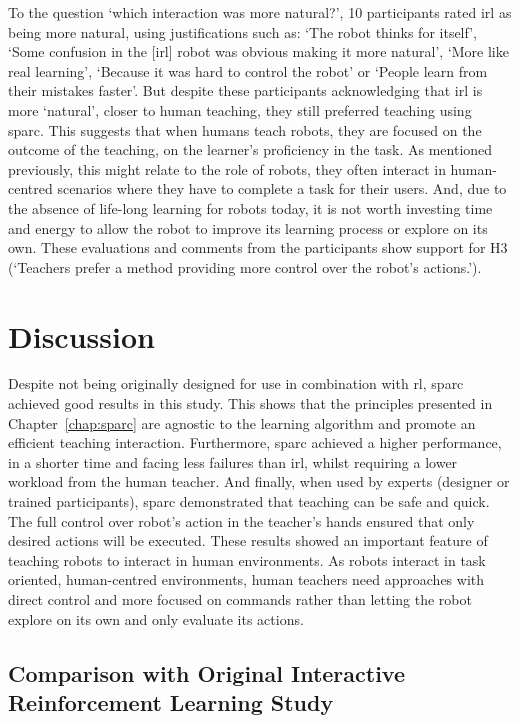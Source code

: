 To the question `which interaction was more natural?', 10 participants rated \gls{irl} as being more natural, using justifications such as: `The robot thinks for itself', `Some confusion in the [\gls{irl}] robot was obvious making it more natural', `More like real learning', `Because it was hard to control the robot' or `People learn from their mistakes faster'. But despite these participants acknowledging that \gls{irl} is more `natural', closer to human teaching, they still preferred teaching using \gls{sparc}. This suggests that when humans teach robots, they are focused on the outcome of the teaching, on the learner's proficiency in the task. As mentioned previously, this might relate to the role of robots, they often interact in human-centred scenarios where they have to complete a task for their users. And, due to the absence of life-long learning for robots today, it is not worth investing time and energy to allow the robot to improve its learning process or explore on its own. These evaluations and comments from the participants show support for H3 (`Teachers prefer a method providing more control over the robot's actions.').

\section{Discussion}
\label{sec:control_discussion}

Despite not being originally designed for use in combination with \acrlong{rl}, \gls{sparc} achieved good results in this study. This shows that the principles presented in Chapter~\ref{chap:sparc} are agnostic to the learning algorithm and promote an efficient teaching interaction. Furthermore, \gls{sparc} achieved a higher performance, in a shorter time and facing less failures than \gls{irl}, whilst requiring a lower workload from the human teacher. And finally, when used by experts (designer or trained participants), \gls{sparc} demonstrated that teaching can be safe and quick. The full control over robot's action in the teacher's hands ensured that only desired actions will be executed. These results showed an important feature of teaching robots to interact in human environments. As robots interact in task oriented, human-centred environments, human teachers need approaches with direct control and more focused on commands rather than letting the robot explore on its own and only evaluate its actions.

\subsection{Comparison with Original Interactive Reinforcement Learning Study}

